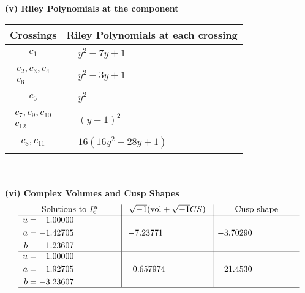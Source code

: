 \documentclass[1p]{elsarticle_modified}
\theoremstyle{definition}
\newcommand{\I}{\sqrt{-1}}
\begin{document}
\newpage\renewcommand{\arraystretch}{1}
\flushleft \textbf{(v) Riley Polynomials at the component}\newline \\
\begin{tabular}{m{50pt}|m{274pt}}
Crossings & \hspace{64pt}Riley Polynomials at each crossing \\
\hline $$\begin{aligned}c_{1}\end{aligned}$$&$\begin{aligned}
&y^2-7 y+1
\end{aligned}$\\
\hline $$\begin{aligned}c_{2},c_{3},c_{4}\\c_{6}\end{aligned}$$&$\begin{aligned}
&y^2-3 y+1
\end{aligned}$\\
\hline $$\begin{aligned}c_{5}\end{aligned}$$&$\begin{aligned}
&y^2
\end{aligned}$\\
\hline $$\begin{aligned}c_{7},c_{9},c_{10}\\c_{12}\end{aligned}$$&$\begin{aligned}
&(y-1)^2
\end{aligned}$\\
\hline $$\begin{aligned}c_{8},c_{11}\end{aligned}$$&$\begin{aligned}
&16(16 y^2-28 y+1)
\end{aligned}$\\
\hline
\end{tabular}\\~\\
\newpage\flushleft \textbf{(vi) Complex Volumes and Cusp Shapes}
$$\begin{array}{c|c|c}  
\text{Solutions to }I^u_{6}& \I (\text{vol} + \sqrt{-1}CS) & \text{Cusp shape}\\
 \hline 
\begin{aligned}
u &= \phantom{-}1.00000\phantom{ +0.000000I} \\
a &= -1.42705\phantom{ +0.000000I} \\
b &= \phantom{-}1.23607\phantom{ +0.000000I}\end{aligned}
 & -7.23771\phantom{ +0.000000I} & -3.70290\phantom{ +0.000000I} \\ \hline\begin{aligned}
u &= \phantom{-}1.00000\phantom{ +0.000000I} \\
a &= \phantom{-}1.92705\phantom{ +0.000000I} \\
b &= -3.23607\phantom{ +0.000000I}\end{aligned}
 & \phantom{-}0.657974\phantom{ +0.000000I} & \phantom{-}21.4530\phantom{ +0.000000I}\\
 \hline 
 \end{array}$$\newpage
\end{document}
